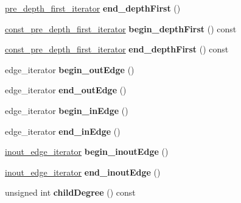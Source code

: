 \begin{DoxyCompactItemize}
\item 
\mbox{\label{classNodeBase_a7865bf4dcd779b5175c14dbb3da37740}} 
\mbox{\hyperlink{classDepthFirstIterator}{pre\+\_\+depth\+\_\+first\+\_\+iterator}} {\bfseries end\+\_\+depth\+First} ()
\item 
\mbox{\label{classNodeBase_a313eeddc2abfb3d6360f163e21ba4d9c}} 
\mbox{\hyperlink{classDepthFirstIterator}{const\+\_\+pre\+\_\+depth\+\_\+first\+\_\+iterator}} {\bfseries begin\+\_\+depth\+First} () const
\item 
\mbox{\label{classNodeBase_ad86ccefbbb2078b9de4dd02953dd52d6}} 
\mbox{\hyperlink{classDepthFirstIterator}{const\+\_\+pre\+\_\+depth\+\_\+first\+\_\+iterator}} {\bfseries end\+\_\+depth\+First} () const
\item 
\mbox{\label{classNodeBase_a94c96d8e38ec3acf827ca982942b9544}} 
edge\+\_\+iterator {\bfseries begin\+\_\+out\+Edge} ()
\item 
\mbox{\label{classNodeBase_a80fcee7928a0bdd9622a47b929fa75f5}} 
edge\+\_\+iterator {\bfseries end\+\_\+out\+Edge} ()
\item 
\mbox{\label{classNodeBase_afbf8be6a10ef588bb2906b92a0a27f02}} 
edge\+\_\+iterator {\bfseries begin\+\_\+in\+Edge} ()
\item 
\mbox{\label{classNodeBase_a970abf20228e250c63811c2adac350b8}} 
edge\+\_\+iterator {\bfseries end\+\_\+in\+Edge} ()
\item 
\mbox{\label{classNodeBase_ad53907e26eb8fad75ea933b1e1e3617c}} 
\mbox{\hyperlink{classgap__iterator}{inout\+\_\+edge\+\_\+iterator}} {\bfseries begin\+\_\+inout\+Edge} ()
\item 
\mbox{\label{classNodeBase_a6df040e970742df6b7867444a8ecacb2}} 
\mbox{\hyperlink{classgap__iterator}{inout\+\_\+edge\+\_\+iterator}} {\bfseries end\+\_\+inout\+Edge} ()
\item 
\mbox{\label{classNodeBase_af0a184d33dd197dec7436b54c329252c}} 
unsigned int {\bfseries child\+Degree} () const
\item 

\end{DoxyCompactItemize}
